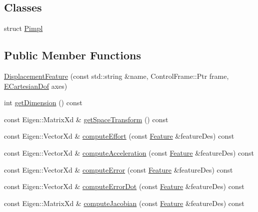 \subsection*{Classes}
\begin{DoxyCompactItemize}
\item 
struct \hyperlink{structocra_1_1DisplacementFeature_1_1Pimpl}{Pimpl}
\end{DoxyCompactItemize}
\subsection*{Public Member Functions}
\begin{DoxyCompactItemize}
\item 
\hyperlink{classocra_1_1DisplacementFeature_a9c48bb5ac5d4a856df9c2d879bc4b072}{Displacement\+Feature} (const std\+::string \&name, Control\+Frame\+::\+Ptr frame, \hyperlink{namespaceocra_a436781c7059a0f76027df1c652126260}{E\+Cartesian\+Dof} axes)
\item 
int \hyperlink{classocra_1_1DisplacementFeature_a5b8dee4219bf6f5a44de8aac74f1ee7b}{get\+Dimension} () const 
\item 
const Eigen\+::\+Matrix\+Xd \& \hyperlink{classocra_1_1DisplacementFeature_a461311cc93da15c39ab19f16b386c590}{get\+Space\+Transform} () const 
\item 
const Eigen\+::\+Vector\+Xd \& \hyperlink{classocra_1_1DisplacementFeature_abba95a32a439e9be764647ffc6b39fef}{compute\+Effort} (const \hyperlink{classocra_1_1Feature}{Feature} \&feature\+Des) const 
\item 
const Eigen\+::\+Vector\+Xd \& \hyperlink{classocra_1_1DisplacementFeature_a446c8827aee51bf710dd1112d15648c5}{compute\+Acceleration} (const \hyperlink{classocra_1_1Feature}{Feature} \&feature\+Des) const 
\item 
const Eigen\+::\+Vector\+Xd \& \hyperlink{classocra_1_1DisplacementFeature_a9f589dcc09eb4cfd6d69f48ed24ece51}{compute\+Error} (const \hyperlink{classocra_1_1Feature}{Feature} \&feature\+Des) const 
\item 
const Eigen\+::\+Vector\+Xd \& \hyperlink{classocra_1_1DisplacementFeature_ac016c348e9be5118b9d1410d807a8ac4}{compute\+Error\+Dot} (const \hyperlink{classocra_1_1Feature}{Feature} \&feature\+Des) const 
\item 
const Eigen\+::\+Matrix\+Xd \& \hyperlink{classocra_1_1DisplacementFeature_a61c4f5ec60f41825100f98a6393780c6}{compute\+Jacobian} (const \hyperlink{classocra_1_1Feature}{Feature} \&feature\+Des) const 
\item 

\end{DoxyCompactItemize}
